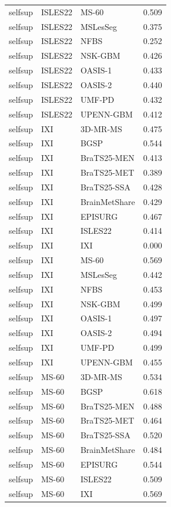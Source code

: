 \begin{tabular}{lllr}
selfsup & ISLES22 & MS-60 & 0.509 \\
selfsup & ISLES22 & MSLesSeg & 0.375 \\
selfsup & ISLES22 & NFBS & 0.252 \\
selfsup & ISLES22 & NSK-GBM & 0.426 \\
selfsup & ISLES22 & OASIS-1 & 0.433 \\
selfsup & ISLES22 & OASIS-2 & 0.440 \\
selfsup & ISLES22 & UMF-PD & 0.432 \\
selfsup & ISLES22 & UPENN-GBM & 0.412 \\
selfsup & IXI & 3D-MR-MS & 0.475 \\
selfsup & IXI & BGSP & 0.544 \\
selfsup & IXI & BraTS25-MEN & 0.413 \\
selfsup & IXI & BraTS25-MET & 0.389 \\
selfsup & IXI & BraTS25-SSA & 0.428 \\
selfsup & IXI & BrainMetShare & 0.429 \\
selfsup & IXI & EPISURG & 0.467 \\
selfsup & IXI & ISLES22 & 0.414 \\
selfsup & IXI & IXI & 0.000 \\
selfsup & IXI & MS-60 & 0.569 \\
selfsup & IXI & MSLesSeg & 0.442 \\
selfsup & IXI & NFBS & 0.453 \\
selfsup & IXI & NSK-GBM & 0.499 \\
selfsup & IXI & OASIS-1 & 0.497 \\
selfsup & IXI & OASIS-2 & 0.494 \\
selfsup & IXI & UMF-PD & 0.499 \\
selfsup & IXI & UPENN-GBM & 0.455 \\
selfsup & MS-60 & 3D-MR-MS & 0.534 \\
selfsup & MS-60 & BGSP & 0.618 \\
selfsup & MS-60 & BraTS25-MEN & 0.488 \\
selfsup & MS-60 & BraTS25-MET & 0.464 \\
selfsup & MS-60 & BraTS25-SSA & 0.520 \\
selfsup & MS-60 & BrainMetShare & 0.484 \\
selfsup & MS-60 & EPISURG & 0.544 \\
selfsup & MS-60 & ISLES22 & 0.509 \\
selfsup & MS-60 & IXI & 0.569 \\

\end{tabular}
